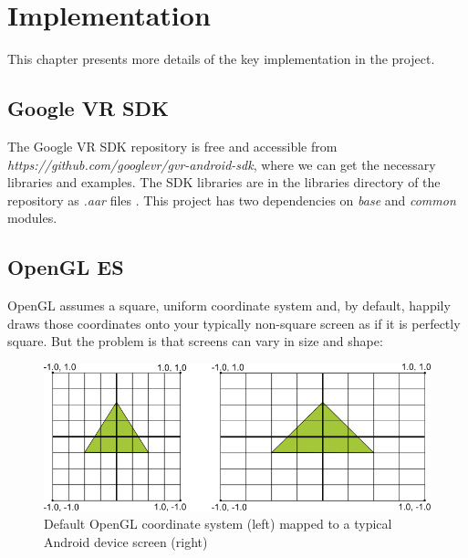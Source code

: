 \label{chapter-implementation}
\chapter{Implementation}

This chapter presents more details of the key implementation in the project.

\section{Google VR SDK}

The Google VR SDK repository is free and accessible from \emph{https://github.com/googlevr/gvr-android-sdk}, where we can get the necessary libraries and examples. The SDK libraries are in the libraries directory of the repository as \emph{.aar} files \parencite{google.aar-format.2016}. This project has two dependencies on \emph{base} and \emph{common} modules.

\section{OpenGL ES}

OpenGL assumes a square, uniform coordinate system and, by default, happily draws those coordinates onto your typically non-square screen as if it is perfectly square. But the problem is that screens can vary in size and shape:

\begin{figure}[H]
\caption[opengl-coordinates]{Default OpenGL coordinate system (left) mapped to a typical Android device screen (right) \parencite{google.opengles.2016}}
\label{fig:opengl-coordinates}
\centering
\includegraphics[width=\linewidth]{Figures/opengl-coordinates.png}
\decoRule
\end{figure}

